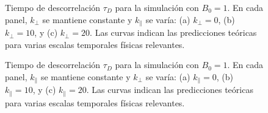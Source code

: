 \begin{figure}
  \centering

  \caption{Tiempo de descorrelación $\tau_D$ para la simulación con
    $B_0=1$. En cada panel, $k_\perp$ se mantiene constante y
    $k_\parallel$ se varía: (a) $k_\perp = 0$, (b) $k_\perp = 10$,
    y (c) $k_\perp = 20$. Las curvas indican las predicciones teóricas
    para varias escalas temporales físicas relevantes.}
  \label{fig3-5:B1_bvf_b_kperp}
\end{figure}

\begin{figure}
  \centering

  \caption{Tiempo de descorrelación $\tau_D$ para la simulación con
    $B_0=1$. En cada panel, $k_\parallel$ se mantiene constante y
    $k_\perp$ se varía: (a) $k_\parallel = 0$, (b) $k_\parallel = 10$,
    y (c) $k_\parallel = 20$. Las curvas indican las predicciones teóricas
    para varias escalas temporales físicas relevantes.}
  \label{fig3-5:B1_bvf_b_kpara}
\end{figure}

